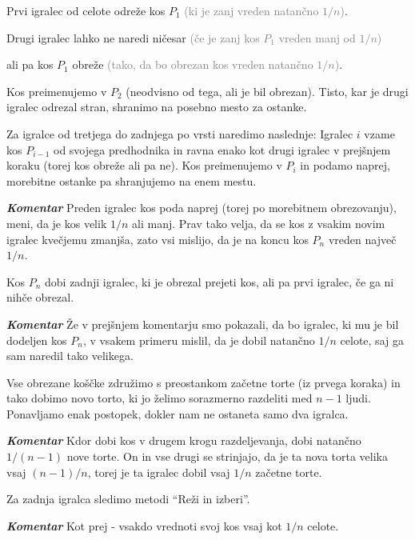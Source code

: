 \documentclass[a4paper,12pt]{article}
\begin{document}
\begin{protokol}

\item Prvi igralec od celote odreže kos $P_1$ \textcolor{gray}{(ki je zanj vreden natančno $1/n$)}.

\item Drugi igralec lahko ne naredi ničesar \textcolor{gray}{(če je zanj kos $P_1$ vreden manj od $1/n$)}

ali pa kos $P_1$ obreže \textcolor{gray}{(tako, da bo obrezan kos vreden natančno $1/n$)}.

Kos preimenujemo v $P_2$ (neodvisno od tega, ali je bil obrezan). Tisto, kar je drugi igralec odrezal stran, shranimo na posebno mesto za ostanke.

\item Za igralce od tretjega do zadnjega po vrsti naredimo naslednje: Igralec $i$ vzame kos $P_{i-1}$ od svojega predhodnika in ravna enako kot drugi igralec v prejšnjem koraku (torej kos obreže ali pa ne). Kos preimenujemo v $P_i$ in podamo naprej, morebitne ostanke pa shranjujemo na enem mestu.

\item [\textbf{\em Komentar}] Preden igralec kos poda naprej (torej po morebitnem obrezovanju), meni, da je kos velik $1/n$ ali manj. Prav tako velja, da se kos z vsakim novim igralec kvečjemu zmanjša, zato vsi mislijo, da je na koncu kos $P_n$ vreden največ $1/n$.

\item Kos $P_n$ dobi zadnji igralec, ki je obrezal prejeti kos, ali pa prvi igralec, če ga ni nihče obrezal.

\item [\textbf{\em Komentar}] Že v prejšnjem komentarju smo pokazali, da bo igralec, ki mu je bil dodeljen kos $P_n$, v vsakem primeru mislil, da je dobil natančno $1/n$ celote, saj ga sam naredil tako velikega. %

\item Vse obrezane koščke združimo s preostankom začetne torte (iz prvega koraka) in tako dobimo novo torto, ki jo želimo sorazmerno razdeliti med $n - 1$ ljudi. Ponavljamo enak postopek, dokler nam ne ostaneta samo dva igralca.

\item [\textbf{\em Komentar}] Kdor dobi kos v drugem krogu razdeljevanja, dobi natančno $1/(n - 1)$ nove torte. On in vse drugi se strinjajo, da je ta nova torta velika vsaj $(n - 1)/n$, torej je ta igralec dobil vsaj $1/n$ začetne torte.

\item Za zadnja igralca sledimo metodi ``Reži in izberi''.

\item [\textbf{\em Komentar}] Kot prej - vsakdo vrednoti svoj kos vsaj kot $1/n$ celote.

\end{protokol}
\end{document}
